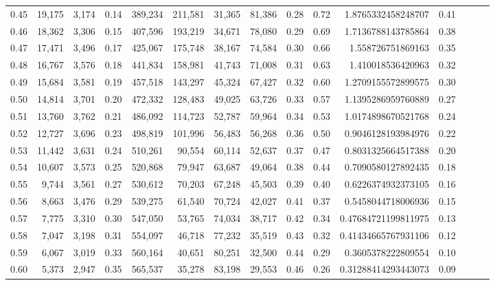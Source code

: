 \begin{tabular}{rrrrrrrrrrrrrrr}
0.45 &  19,175 &  3,174 &  0.14 &  389,234 &  211,581 &   31,365 &   81,386 &  0.28 &  0.72 &      1.8765332458248707 &      0.41 \\
0.46 &  18,362 &  3,306 &  0.15 &  407,596 &  193,219 &   34,671 &   78,080 &  0.29 &  0.69 &      1.7136788143785864 &      0.38 \\
0.47 &  17,471 &  3,496 &  0.17 &  425,067 &  175,748 &   38,167 &   74,584 &  0.30 &  0.66 &       1.558726751869163 &      0.35 \\
0.48 &  16,767 &  3,576 &  0.18 &  441,834 &  158,981 &   41,743 &   71,008 &  0.31 &  0.63 &       1.410018536420963 &      0.32 \\
0.49 &  15,684 &  3,581 &  0.19 &  457,518 &  143,297 &   45,324 &   67,427 &  0.32 &  0.60 &      1.2709155572899575 &      0.30 \\
0.50 &  14,814 &  3,701 &  0.20 &  472,332 &  128,483 &   49,025 &   63,726 &  0.33 &  0.57 &      1.1395286959760889 &      0.27 \\
0.51 &  13,760 &  3,762 &  0.21 &  486,092 &  114,723 &   52,787 &   59,964 &  0.34 &  0.53 &      1.0174898670521768 &      0.24 \\
0.52 &  12,727 &  3,696 &  0.23 &  498,819 &  101,996 &   56,483 &   56,268 &  0.36 &  0.50 &      0.9046128193984976 &      0.22 \\
0.53 &  11,442 &  3,631 &  0.24 &  510,261 &   90,554 &   60,114 &   52,637 &  0.37 &  0.47 &      0.8031325664517388 &      0.20 \\
0.54 &  10,607 &  3,573 &  0.25 &  520,868 &   79,947 &   63,687 &   49,064 &  0.38 &  0.44 &      0.7090580127892435 &      0.18 \\
0.55 &   9,744 &  3,561 &  0.27 &  530,612 &   70,203 &   67,248 &   45,503 &  0.39 &  0.40 &      0.6226374932373105 &      0.16 \\
0.56 &   8,663 &  3,476 &  0.29 &  539,275 &   61,540 &   70,724 &   42,027 &  0.41 &  0.37 &      0.5458044718006936 &      0.15 \\
0.57 &   7,775 &  3,310 &  0.30 &  547,050 &   53,765 &   74,034 &   38,717 &  0.42 &  0.34 &     0.47684721199811975 &      0.13 \\
0.58 &   7,047 &  3,198 &  0.31 &  554,097 &   46,718 &   77,232 &   35,519 &  0.43 &  0.32 &     0.41434665767931106 &      0.12 \\
0.59 &   6,067 &  3,019 &  0.33 &  560,164 &   40,651 &   80,251 &   32,500 &  0.44 &  0.29 &      0.3605378222809554 &      0.10 \\
0.60 &   5,373 &  2,947 &  0.35 &  565,537 &   35,278 &   83,198 &   29,553 &  0.46 &  0.26 &     0.31288414293443073 &      0.09 \\

\end{tabular}
